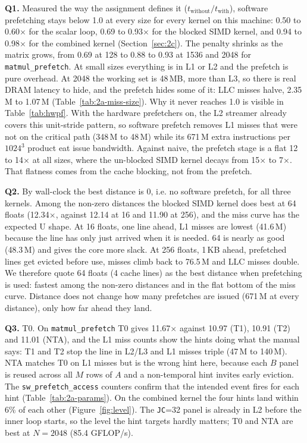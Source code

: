 \documentclass[11pt,a4paper]{article}
\begin{document}
\textbf{Q1.} Measured the way the assignment defines it ($t_{\text{without}}/t_{\text{with}}$), software prefetching stays below 1.0 at every size for every kernel on this machine: 0.50 to 0.60$\times$ for the scalar loop, 0.69 to 0.93$\times$ for the blocked SIMD kernel, and 0.94 to 0.98$\times$ for the combined kernel (Section~\ref{sec:2c}). The penalty shrinks as the matrix grows, from 0.69 at 128 to 0.88 to 0.93 at 1536 and 2048 for \texttt{matmul\_prefetch}. At small sizes everything is in L1 or L2 and the prefetch is pure overhead. At 2048 the working set is 48\,MB, more than L3, so there is real DRAM latency to hide, and the prefetch hides some of it: LLC misses halve, 2.35\,M to 1.07\,M (Table~\ref{tab:2a-miss-size}). Why it never reaches 1.0 is visible in Table~\ref{tab:hwpf}. With the hardware prefetchers on, the L2 streamer already covers this unit-stride pattern, so software prefetch removes L1 misses that were not on the critical path (348\,M to 48\,M) while its 671\,M extra instructions per $1024^3$ product eat issue bandwidth. Against naive, the prefetch stage is a flat 12 to 14$\times$ at all sizes, where the un-blocked SIMD kernel decays from 15$\times$ to 7$\times$. That flatness comes from the cache blocking, not from the prefetch.

\textbf{Q2.} By wall-clock the best distance is 0, i.e. no software prefetch, for all three kernels. Among the non-zero distances the blocked SIMD kernel does best at 64 floats (12.34$\times$, against 12.14 at 16 and 11.90 at 256), and the miss curve has the expected U shape. At 16 floats, one line ahead, L1 misses are lowest (41.6\,M) because the line has only just arrived when it is needed. 64 is nearly as good (48.3\,M) and gives the core more slack. At 256 floats, 1\,KB ahead, prefetched lines get evicted before use, misses climb back to 76.5\,M and LLC misses double. We therefore quote 64 floats (4 cache lines) as the best distance when prefetching is used: fastest among the non-zero distances and in the flat bottom of the miss curve. Distance does not change how many prefetches are issued (671\,M at every distance), only how far ahead they land.

\textbf{Q3.} T0. On \texttt{matmul\_prefetch} T0 gives 11.67$\times$ against 10.97 (T1), 10.91 (T2) and 11.01 (NTA), and the L1 miss counts show the hints doing what the manual says: T1 and T2 stop the line in L2/L3 and L1 misses triple (47\,M to 140\,M). NTA matches T0 on L1 misses but is the wrong hint here, because each $B$ panel is reused across all $M$ rows of $A$ and a non-temporal hint invites early eviction. The \texttt{sw\_prefetch\_access} counters confirm that the intended event fires for each hint (Table~\ref{tab:2a-params}). On the combined kernel the four hints land within 6\% of each other (Figure~\ref{fig:level}). The \texttt{JC}=32 panel is already in L2 before the inner loop starts, so the level the hint targets hardly matters; T0 and NTA are best at $N=2048$ (85.4 GFLOP/s).
\end{document}
